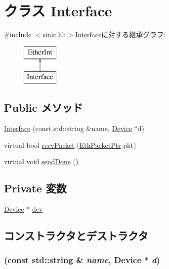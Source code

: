 \hypertarget{classSinic_1_1Interface}{
\section{クラス Interface}
\label{classSinic_1_1Interface}
}


{\ttfamily \#include $<$sinic.hh$>$}Interfaceに対する継承グラフ:\begin{figure}[H]
\begin{center}
\leavevmode
\includegraphics[height=2cm]{classSinic_1_1Interface}
\end{center}
\end{figure}
\subsection*{Public メソッド}
\begin{DoxyCompactItemize}
\item 
\hyperlink{classSinic_1_1Interface_a6ad1baa3798920369a4dca54848444f8}{Interface} (const std::string \&name, \hyperlink{classSinic_1_1Device}{Device} $\ast$d)
\item 
virtual bool \hyperlink{classSinic_1_1Interface_a9bd96a108d6f58f140c9f7d83726eebe}{recvPacket} (\hyperlink{classRefCountingPtr}{EthPacketPtr} pkt)
\item 
virtual void \hyperlink{classSinic_1_1Interface_a967489e0b2900f4b12d99e6257d24dbe}{sendDone} ()
\end{DoxyCompactItemize}
\subsection*{Private 変数}
\begin{DoxyCompactItemize}
\item 
\hyperlink{classSinic_1_1Device}{Device} $\ast$ \hyperlink{classSinic_1_1Interface_a4b03696f02d977bb09c0ed16cd40aba0}{dev}
\end{DoxyCompactItemize}


\subsection{コンストラクタとデストラクタ}
\hypertarget{classSinic_1_1Interface_a6ad1baa3798920369a4dca54848444f8}{
\subsubsection[{Interface}]{ (const std::string \& {\em name}, \/  {\bf Device} $\ast$ {\em d})}}
\label{classSinic_1_1Interface_a6ad1baa3798920369a4dca54848444f8}



